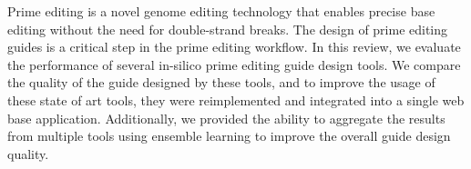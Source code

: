     Prime editing is a novel genome editing technology that enables precise base editing without the need for double-strand breaks. The design of prime editing guides is a critical step in the prime editing workflow. In this review, we evaluate the performance of several in-silico prime editing guide design tools. We compare the quality of the guide designed by these tools, and to improve the usage of these state of art tools, they were reimplemented and integrated into a single web base application. Additionally, we provided the ability to aggregate the results from multiple tools using ensemble learning to improve the overall guide design quality.
